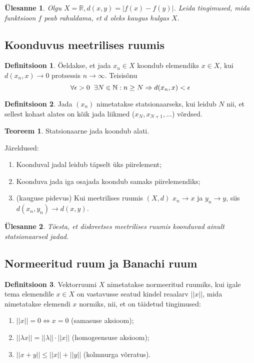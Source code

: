 \documentclass{article}[12pt]
\newcommand{\h}{\hspace{0.2cm}}
\newcommand{\R}{\mathbb{R}}
\newcommand{\N}{\mathbb{N}}
\newtheorem{yl}{Ülesanne}[section]
\theoremstyle{definition}
\newtheorem{definition}{Definitsioon}[section]
\theoremstyle{definition}
\newtheorem{theorem}{Teoreem}[section]
\theoremstyle{definition}
\theoremstyle{break}
\begin{document}
\begin{yl}
	Olgu $X=\R, d(x,y) = |f(x)-f(y)|$. Leida tingimused, mida funktsioon $f$ peab rahuldama, et $d$ oleks kaugus hulgas $X$.	
\end{yl}

\subsection{Koonduvus meetrilises ruumis}

\begin{definition}
	Öeldakse, et jada $x_n\in X$ koondub elemendiks $x\in X$, kui $d(x_n,x)\rightarrow 0$ protsessis $n\rightarrow \infty$.
	Teisisõnu
	\[
		\forall \epsilon > 0 \h\exists N\in \N : n\geq N\Rightarrow d(x_n,x)<\epsilon
	\]	
\end{definition}
\begin{definition}
	Jada $(x_n)$ nimetatakse statsionaarseks, kui leidub $N$ nii, et sellest kohast alates on kõik jada liikmed ($x_N,x_{N+1},\dots$) võrdsed.
\end{definition}
\begin{theorem}
	Statsionaarne jada koondub alati.
\end{theorem}

Järeldused:
\begin{enumerate}
	\item Koonduval jadal leidub täpselt üks piirelement;
	\item Koonduva jada iga osajada koondub samaks piirelemendiks;
	\item (kauguse pidevus) Kui meetrilises ruumis $(X,d)$ $x_n\rightarrow x$ ja $y_n \rightarrow y$, siis $d(x_n,y_n)\rightarrow d(x,y)$.
\end{enumerate}

\begin{yl}
	Tõesta, et diskreetses meetrilises ruumis koonduvad ainult statsionaarsed jadad.
\end{yl}

\subsection{Normeeritud ruum ja Banachi ruum}

\begin{definition}
	Vektorruumi $X$ nimetatakse normeeritud ruumiks, kui igale tema elemendile $x\in X$ on vastavusse seatud kindel reaalarv $||x||$, mida nimetatakse elemendi $x$ normiks, nii, et on täidetud tingimused:
	\begin{enumerate}
		\item $||x|| = 0 \Leftrightarrow x=0$ (samasuse aksioom);
		\item $||\lambda x|| = ||\lambda||\cdot ||x||$ (homogeensuse aksioom);
		\item $||x+y|| \leq ||x|| + ||y||$ (kolmnurga võrratus).
	\end{enumerate}	
\end{definition}
\end{document}
